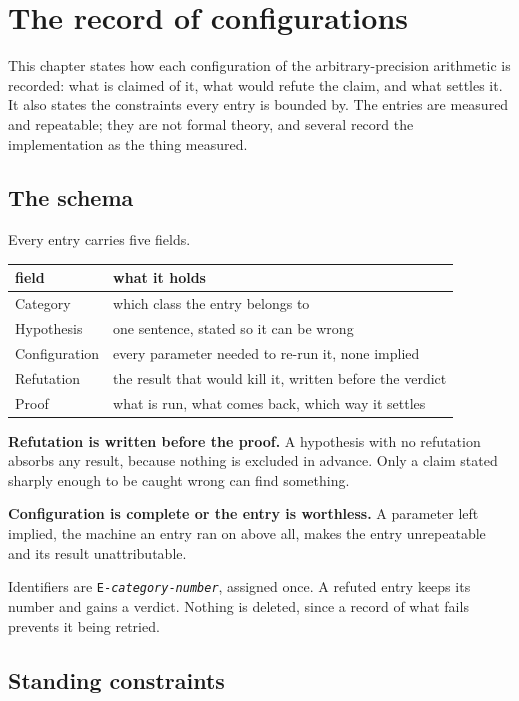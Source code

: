 \chapter{The record of configurations}

This chapter states how each configuration of the arbitrary-precision arithmetic is recorded: what
is claimed of it, what would refute the claim, and what settles it. It also states the constraints
every entry is bounded by. The entries are measured and repeatable; they are not formal theory, and
several record the implementation as the thing measured.

\section{The schema}

Every entry carries five fields.

\begin{center}
\begin{tabular}{@{}ll@{}}
\toprule
field & what it holds \\
\midrule
Category & which class the entry belongs to \\
Hypothesis & one sentence, stated so it can be wrong \\
Configuration & every parameter needed to re-run it, none implied \\
Refutation & the result that would kill it, written before the verdict \\
Proof & what is run, what comes back, which way it settles \\
\bottomrule
\end{tabular}
\end{center}

\textbf{Refutation is written before the proof.} A hypothesis with no refutation absorbs any result,
because nothing is excluded in advance. Only a claim stated sharply enough to be caught wrong can find
something.

\textbf{Configuration is complete or the entry is worthless.} A parameter left implied, the machine an
entry ran on above all, makes the entry unrepeatable and its result unattributable.

Identifiers are \texttt{E-\textit{category}-\textit{number}}, assigned once. A refuted entry keeps its
number and gains a verdict. Nothing is deleted, since a record of what fails prevents it being
retried.

\section{Standing constraints}

